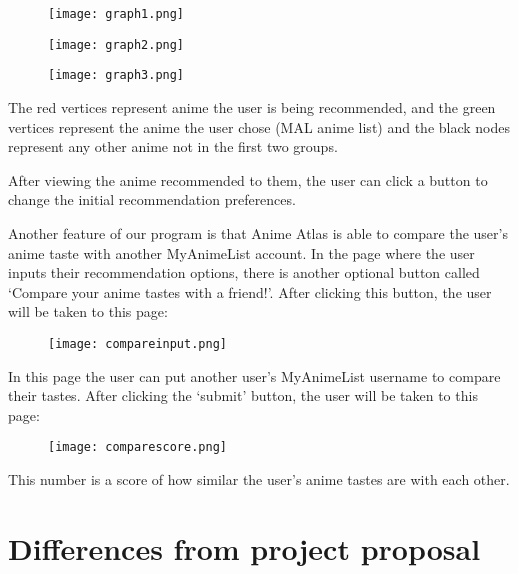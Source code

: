 \documentclass[fontsize=11pt]{article}
\begin{document}
\begin{figure}[htp]
    \centering
    \texttt{[image: graph1.png]}
\end{figure}

\begin{figure}[htp]
    \centering
    \texttt{[image: graph2.png]}
\end{figure}

\begin{figure}[htp]
    \centering
    \texttt{[image: graph3.png]}
\end{figure}

\newpage

\item[] The red vertices represent anime the user is being recommended, and the green vertices represent the anime the user chose (MAL anime list) and the black nodes represent any other anime not in the first two groups.

\item[] After viewing the anime recommended to them, the user can click a button to change the initial recommendation preferences. 

\item[] Another feature of our program is that Anime Atlas is able to compare the user's anime taste with another MyAnimeList account. In the page where the user inputs their recommendation options, there is another optional button called `Compare your anime tastes with a friend!'. After clicking this button, the user will be taken to this page:

\begin{figure}[htp]
    \centering
    \texttt{[image: compareinput.png]}
\end{figure}

\newpage

\item[] In this page the user can put another user's MyAnimeList username to compare their tastes. After clicking the `submit' button, the user will be taken to this page:

\begin{figure}[htp]
    \centering
    \texttt{[image: comparescore.png]}
\end{figure}

\item[] This number is a score of how similar the user's anime tastes are with each other. 


\section*{Differences from project proposal}
\end{document}
